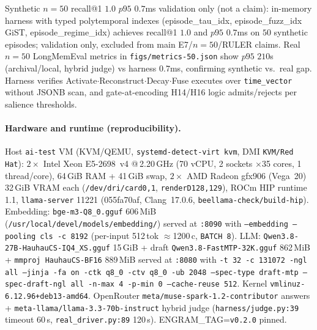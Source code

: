 Synthetic $n{=}50$ recall@1 $1.0$ $p95$ $0.7$ms validation only (not a claim): in-memory harness with typed polytemporal indexes (episode\_tau\_idx, episode\_fuzz\_idx GiST, episode\_regime\_idx) achieves recall@1 $1.0$ and $p95$ $0.7$ms on $50$ synthetic episodes; validation only, excluded from main E7/$n{=}50$/RULER claims. Real $n{=}50$ LongMemEval metrics in \texttt{figs/metrics-50.json} show $p95$ $210$s (archival/local, hybrid judge) vs harness $0.7$ms, confirming synthetic vs.\ real gap. Harness verifies Activate$\cdot$Reconstruct$\cdot$Decay$\cdot$Fuse executes over \texttt{time\_vector} without JSONB scan, and gate-at-encoding H14/H16 logic admits/rejects per salience thresholds.

\paragraph{Hardware and runtime (reproducibility).} Host \texttt{ai-test} VM (KVM/QEMU, \texttt{systemd-detect-virt kvm}, DMI \texttt{KVM/Red Hat}): $2\times$ Intel Xeon E5-2698~v4 @\,2.20\,GHz (70 vCPU, 2 sockets $\times$35 cores, 1 thread/core), 64\,GiB RAM + 41\,GiB swap, $2\times$ AMD Radeon gfx906 (Vega~20) 32\,GiB VRAM each (\texttt{/dev/dri/card0,1}, \texttt{renderD128,129}), ROCm HIP runtime 1.1, \texttt{llama-server} 11221 (055fa70af, Clang~17.0.6, \texttt{beellama-check/build-hip}). Embedding: \texttt{bge-m3-Q8\_0.gguf} 606\,MiB (\texttt{/usr/local/devel/models/embedding/}) served at \texttt{:8090} with \texttt{--embedding --pooling cls -c 8192} (per-input 512\,tok $\approx$1200\,c, \texttt{BATCH 8}). LLM: \texttt{Qwen3.8-27B-HauhauCS-IQ4\_XS.gguf} 15\,GiB + draft \texttt{Qwen3.8-FastMTP-32K.gguf} 862\,MiB + \texttt{mmproj HauhauCS-BF16} 889\,MiB served at \texttt{:8080} with \texttt{-t 32 -c 131072 -ngl all --jinja -fa on -ctk q8\_0 -ctv q8\_0 -ub 2048 --spec-type draft-mtp --spec-draft-ngl all -n-max 4 -p-min 0 --cache-reuse 512}. Kernel \texttt{vmlinuz-6.12.96+deb13-amd64}. OpenRouter \texttt{meta/muse-spark-1.2-contributor} answers + \texttt{meta-llama/llama-3.3-70b-instruct} hybrid judge (\texttt{harness/judge.py:39} timeout 60\,s, \texttt{real\_driver.py:89} 120\,s). ENGRAM\_TAG=\texttt{v0.2.0} pinned.
